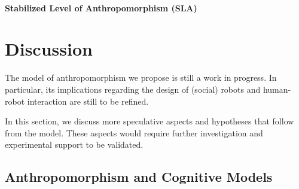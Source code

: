 \documentclass[lettersize, apacite, twoside, HRI]{apa_HRI}
\begin{document}
\paragraph{Stabilized Level of Anthropomorphism (SLA)}


%
%
%
%
%
%

\section{Discussion}
\label{sec:discussion}

The model of anthropomorphism we propose is still a work in progress. In
particular, its implications regarding the design of (social) robots and
human-robot interaction are still to be refined.

In this section, we discuss more speculative aspects and hypotheses that follow
from the model. These aspects would require further investigation and
experimental support to be validated.

\subsection{Anthropomorphism and Cognitive Models}
\label{sec:cognitivemodel}
\end{document}
